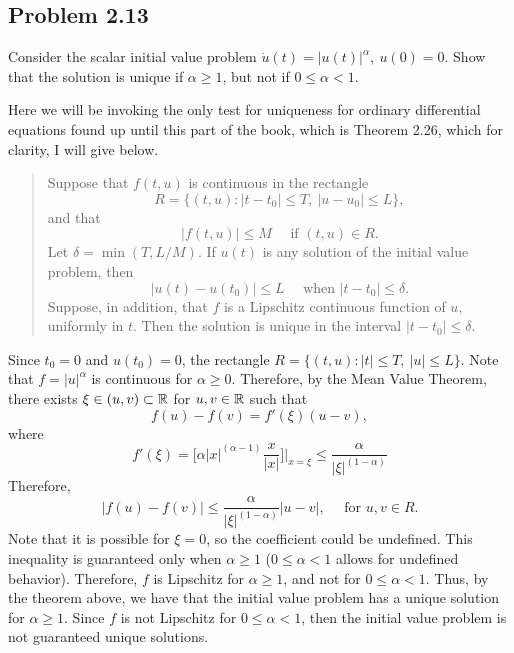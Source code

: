 \subsection{Problem 2.13}
Consider the scalar initial value problem $\Dot{u}(t) = |u(t)|^\alpha, \ u(0) = 0$. Show that the solution is unique if $\alpha \geq 1$, but not if $0 \leq \alpha < 1$. 
\partbreak
\begin{solution}

    Here we will be invoking the only test for uniqueness for ordinary differential equations found up until this part of the book, which is Theorem 2.26, which for clarity, I will give below. 
    
    \tightalignbreak
    \begin{quote}
        Suppose that $f(t, u)$ is continuous in the rectangle 
        \[R = \{(t, u) : |t - t_0| \leq T, \ |u - u_0| \leq L \}, \]
        and that 
        \[|f(t, u)| \leq M \quad \text{ if } (t, u) \in R.\]
        Let $\delta = \min (T, L / M)$. If $u(t)$ is any solution of the initial value problem, then
        \[|u(t) - u(t_0)| \leq L \quad \text{ when } |t - t_0| \leq \delta.\]
        Suppose, in addition, that $f$ is a Lipschitz continuous function of $u$, uniformly in $t$. Then the solution is unique in the interval $|t - t_0| \leq \delta$.  
    \end{quote}
    \vspace{-6mm}{\alignbreak}

    Since $t_0 = 0$ and $u(t_0) = 0$, the rectangle $R = \{(t, u) : |t| \leq T, \ |u| \leq L \}$. Note that $f = |u|^\alpha$ is continuous for $\alpha \geq 0$. Therefore, by the Mean Value Theorem, there exists $\xi \in (u, v) \subset \mathbb{R}$ for $u, v \in \mathbb{R}$ such that 
    \[f(u) - f(v) = f'(\xi)(u - v),\]
    where
    \[f'(\xi) = \Bigg[\alpha |x|^{(\alpha - 1)} \frac{x}{|x|} \Bigg]\Bigg| _{x = \xi} \leq \frac{\alpha}{|\xi|^{(1 - \alpha)}}\]
    Therefore,
    \[|f(u) - f(v)| \leq \frac{\alpha}{|\xi|^{(1 - \alpha)}}|u - v|, \quad \text{ for } u, v \in R.\]
    Note that it is possible for $\xi = 0$, so the coefficient could be undefined. This inequality is guaranteed only when $\alpha \geq 1$ ($0 \leq \alpha < 1$ allows for undefined behavior). Therefore, $f$ is Lipschitz for $\alpha \geq 1$, and not for $0 \leq \alpha < 1$. Thus, by the theorem above, we have that the initial value problem has a unique solution for $\alpha \geq 1$. Since $f$ is not Lipschitz for $0\leq \alpha < 1$, then the initial value problem is not guaranteed unique solutions.     
\end{solution}

